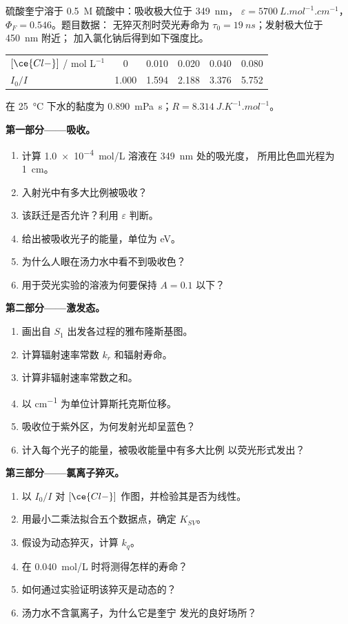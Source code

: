 \begin{problem}
\label{pb:b3:electronic-spectroscopy:1}
硫酸奎宁溶于 \qty{0.5}{M} 硫酸中：吸收极大位于 \qty{349}{nm}，
$\varepsilon = \qty{5700}{L.mol^{-1}.cm^{-1}}$，$\Phi_F = 0.546$。题目数据：
无猝灭剂时荧光寿命为 $\tau_0 = \qty{19}{ns}$；发射极大位于 \qty{450}{nm} 附近；
加入氯化钠后得到如下强度比。
\begin{center}\small
\begin{tabular}{lccccc}
\hline
$[\ce{Cl-}]$ / mol L$^{-1}$ & 0 & 0.010 & 0.020 & 0.040 & 0.080 \\
$I_0/I$ & 1.000 & 1.594 & 2.188 & 3.376 & 5.752 \\ \hline
\end{tabular}
\end{center}
在 \qty{25}{\celsius} 下水的黏度为 \qty{0.890}{mPa.s}；$R =
\qty{8.314}{J.K^{-1}.mol^{-1}}$。

\medskip\noindent\textbf{第一部分——吸收。}
\begin{enumerate}
  \item 计算 \qty{1.0e-4}{mol/L} 溶液在 \qty{349}{nm} 处的吸光度，
        所用比色皿光程为 \qty{1}{cm}。
  \item 入射光中有多大比例被吸收？
  \item 该跃迁是否允许？利用 $\varepsilon$ 判断。
  \item 给出被吸收光子的能量，单位为 eV。
  \item 为什么人眼在汤力水中看不到吸收色？
  \item 用于荧光实验的溶液为何要保持 $A = 0.1$ 以下？
\end{enumerate}

\medskip\noindent\textbf{第二部分——激发态。}
\begin{enumerate}[resume]
  \item 画出自 $S_1$ 出发各过程的雅布隆斯基图。
  \item 计算辐射速率常数 $k_r$ 和辐射寿命。
  \item 计算非辐射速率常数之和。
  \item 以 \unit{cm^{-1}} 为单位计算斯托克斯位移。
  \item 吸收位于紫外区，为何发射光却呈蓝色？
  \item 计入每个光子的能量，被吸收能量中有多大比例
        以荧光形式发出？
\end{enumerate}

\medskip\noindent\textbf{第三部分——氯离子猝灭。}
\begin{enumerate}[resume]
  \item 以 $I_0/I$ 对 $[\ce{Cl-}]$ 作图，并检验其是否为线性。
  \item 用最小二乘法拟合五个数据点，确定 $K_{SV}$。
  \item 假设为动态猝灭，计算 $k_q$。
  \item 在 \qty{0.040}{mol/L} 时将测得怎样的寿命？
  \item 如何通过实验证明该猝灭是动态的？
  \item 汤力水不含氯离子，为什么它是奎宁
        发光的良好场所？
\end{enumerate}


\end{problem}
